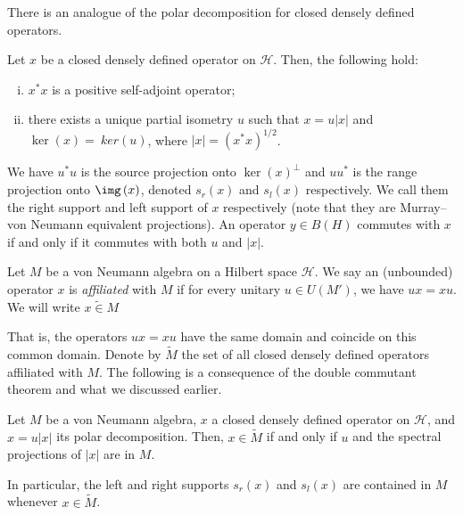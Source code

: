 \documentclass[10pt]{mypackage}
\begin{document}
There is an analogue of the polar decomposition for closed densely defined operators.
\begin{proposition}
  Let $x$ be a closed densely defined operator on $\mathcal{H}$. Then, the following hold:
  \begin{enumerate}[(i)]
    \item $x^{\ast}x$ is a positive self-adjoint operator;
    \item there exists a unique partial isometry $u$ such that $x = u\left\vert x \right\vert$ and $\ker\left( x \right) =\ ker\left( u \right)$, where $\left\vert x \right\vert = \left( x^{\ast}x \right)^{1/2}$.
  \end{enumerate}
\end{proposition}
We have $u^{\ast}u$ is the source projection onto $\ker\left( x \right)^{\perp}$ and $uu^{\ast}$ is the range projection onto $\img\left( x \right)$, denoted $s_r(x)$ and $s_{l}(x)$ respectively. We call them the right support and left support of $x$ respectively (note that they are Murray--von Neumann equivalent projections). An operator $y\in B(H)$ commutes with $x$ if and only if it commutes with both $u$ and $\left\vert x \right\vert$.
\begin{definition}
  Let $M$ be a von Neumann algebra on a Hilbert space $\mathcal{H}$. We say an (unbounded) operator $x$ is \textit{affiliated} with $M$ if for every unitary $u\in U\left( M' \right)$, we have $ux = xu$. We will write $x \widetilde{\in} M$
\end{definition}
That is, the operators $ux = xu$ have the same domain and coincide on this common domain. Denote by $ \widetilde{M} $ the set of all closed densely defined operators affiliated with $M$. The following is a consequence of the double commutant theorem and what we discussed earlier.
\begin{proposition}
  Let $M$ be a von Neumann algebra, $x$ a closed densely defined operator on $\mathcal{H}$, and $x = u\left\vert x \right\vert$ its polar decomposition. Then, $x\in \widetilde{M}$ if and only if $u$ and the spectral projections of $\left\vert x \right\vert$ are in $M$.
\end{proposition}
In particular, the left and right supports $s_r(x)$ and $s_l(x)$ are contained in $M$ whenever $x\in \widetilde{M}$.
\end{document}

